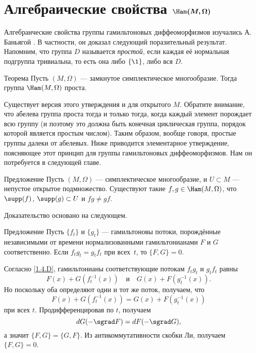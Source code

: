 {\section[\texorpdfstring{Алгебраические свойства $\Ham(M,\Omega)$}{Алгебраические свойства Ham(M,Ω)}]%
{Алгебраические свойства $\bm{\Ham(M, \Omega)}$}

Алгебраические свойства группы гамильтоновых диффеоморфизмов изучались А. Баньягой \cite{B1,B2}.
В частности, он доказал следующий поразительный результат.
Напомним, что группа $D$ называется \emph{простой}, если каждая её нормальная подгруппа тривиальна, то есть она либо $\{\1\}$, либо вся $D$.

\begin{thm}{Теорема}\label{1.5.A}
Пусть $(M, \Omega)$ — замкнутое симплектическое многообразие.
Тогда группа $\Ham (M, \Omega)$ проста.
\end{thm}

Существует версия этого утверждения и для открытого $M$.
Обратите внимание, что абелева группа проста тогда и только тогда, когда каждый элемент порождает всю группу (и поэтому это должна быть конечная циклическая группа, порядок которой является простым числом).
Таким образом, вообще говоря, простые группы далеки от абелевых.
Ниже приводится элементарное утверждение, поясняющее этот принцип для группы гамильтоновых диффеоморфизмов.
Нам он потребуется в следующей главе.

\begin{thm}{Предложение}\label{1.5.B}
Пусть $(M, \Omega)$ — симплектическое многообразие, и $U \subset M$ — непустое открытое подмножество.
Существуют такие $f, g \in \Ham (M, \Omega)$, что $\supp (f)$, $\supp (g) \subset U$ и $f g \ne gf$.
\end{thm}

Доказательство основано на следующем.

\begin{thm}{Предложение}\label{1.5.C}
Пусть $\{f_t\}$ и $\{g_t\}$ — гамильтоновы потоки, порождённые независимыми от времени нормализованными гамильтонианами $F$ и $G$ соответственно.
Если $f_t g_t = g_t f_t$ при всех~$t$, то $\{F, G\} = 0$.
\end{thm}

Согласно \ref{1.4.D}, гамильтонианы соответствующие потокам $f_t g_t$ и $g_t f_t$ равны
\[F(x)+G(f_t^{-1} (x))
\quad\text{и}\quad
G (x) + F (g_t^{-1}(x)).
\]
Но поскольку оба определяют один и тот же поток, получаем, что 
\[F (x) + G (f_t^{-1} (x)) = G (x) + F (g_t^{-1} (x))\]
при всех $t$.
Продифференцировав по $t$, получаем
\[\d G(-\sgrad F)=\d F(-\sgrad G),\]
а значит $\{F, G\} = \{G, F\}$.
Из антикоммутативности скобки Ли, получаем $\{F, G\} = 0$.
\qeds

}
